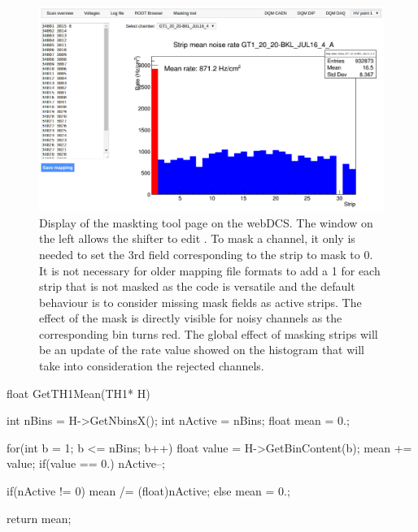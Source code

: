 	\begin{figure}[H]
		\centering
		\includegraphics[width = \linewidth]{fig/app2/MaskingTool.png}
		\caption{\label{fig:maskingtool} Display of the maskting tool page on the webDCS. The window on the left allows the shifter to edit . To mask a channel, it only is needed to set the 3rd field corresponding to the strip to mask to 0. It is not necessary for older mapping file formats to add a 1 for each strip that is not masked as the code is versatile and the default behaviour is to consider missing mask fields as active strips. The effect of the mask is directly visible for noisy channels as the corresponding bin turns red. The global effect of masking strips will be an update of the rate value showed on the histogram that will take into consideration the rejected channels.}
	\end{figure}
	
	\begin{code}
	\begin{cppcode}
float GetTH1Mean(TH1* H){
    int nBins = H->GetNbinsX();
    int nActive = nBins;
    float mean = 0.;

    for(int b = 1; b <= nBins; b++){
        float value = H->GetBinContent(b);
        mean += value;
        if(value == 0.) nActive--;
    }

    if(nActive != 0) mean /= (float)nActive;
    else mean = 0.;

    return mean;
}
	\end{cppcode}
	\label{cpp:th1mean}
	\vspace{5mm}
	\end{code}
	
